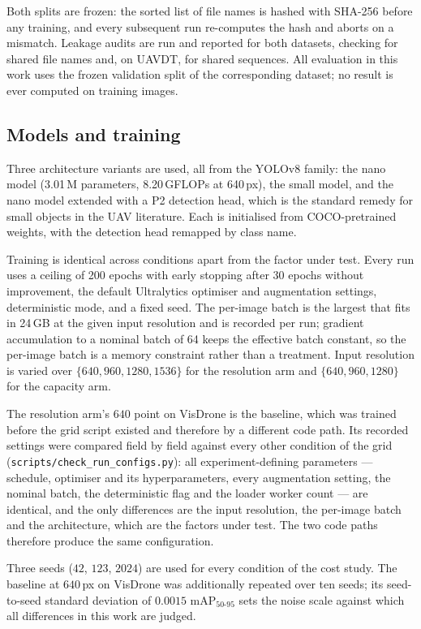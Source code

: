 Both splits are frozen: the sorted list of file names is hashed with SHA-256 before any
training, and every subsequent run re-computes the hash and aborts on a mismatch. Leakage
audits are run and reported for both datasets, checking for shared file names and, on
UAVDT, for shared sequences. All evaluation in this work uses the frozen validation split
of the corresponding dataset; no result is ever computed on training images.

\subsection{Models and training}
\label{sec:setup:training}

Three architecture variants are used, all from the YOLOv8 family: the nano model
(3.01\,M parameters, 8.20\,GFLOPs at 640\,px), the small model, and the nano model extended
with a P2 detection head, which is the standard remedy for small objects in the UAV
literature. Each is initialised from COCO-pretrained weights, with the detection head
remapped by class name.

Training is identical across conditions apart from the factor under test. Every run uses a
ceiling of 200 epochs with early stopping after 30 epochs without improvement, the default
Ultralytics optimiser and augmentation settings, deterministic mode, and a fixed seed.
The per-image batch is the largest that fits in 24\,GB at the given input resolution and is
recorded per run; gradient accumulation to a nominal batch of 64 keeps the effective batch
constant, so the per-image batch is a memory constraint rather than a treatment.
Input resolution is varied over $\{640, 960, 1280, 1536\}$ for the resolution arm and
$\{640, 960, 1280\}$ for the capacity arm.

The resolution arm's $640$ point on VisDrone is the baseline, which was trained before the
grid script existed and therefore by a different code path. Its recorded settings were
compared field by field against every other condition of the grid
(\texttt{scripts/check\_run\_configs.py}): all experiment-defining parameters --- schedule,
optimiser and its hyperparameters, every augmentation setting, the nominal batch, the
deterministic flag and the loader worker count --- are identical, and the only differences
are the input resolution, the per-image batch and the architecture, which are the factors
under test. The two code paths therefore produce the same configuration.

Three seeds ($42$, $123$, $2024$) are used for every condition of the cost study. The
baseline at $640$\,px on VisDrone was additionally repeated over ten seeds; its
seed-to-seed standard deviation of $0.0015$ mAP$_{50\text{-}95}$ sets the noise scale
against which all differences in this work are judged.

